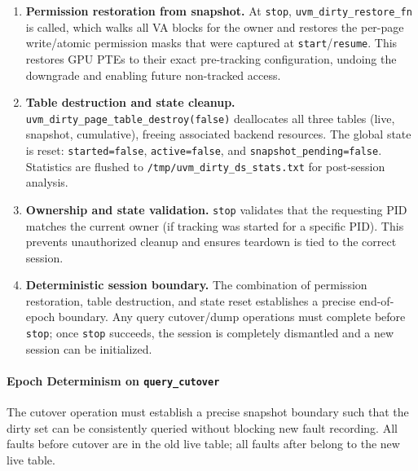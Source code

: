 \begin{enumerate}
    \item \textbf{Permission restoration from snapshot.}
          At \texttt{stop}, \texttt{uvm\_dirty\_restore\_fn} is called, which
          walks all VA blocks for the owner and restores the per-page write/atomic
          permission masks that were captured at \texttt{start}/\texttt{resume}.
          This restores GPU PTEs to their exact pre-tracking configuration,
          undoing the downgrade and enabling future non-tracked access.

    \item \textbf{Table destruction and state cleanup.}
          \texttt{uvm\_dirty\_page\_table\_destroy(false)} deallocates all three
          tables (live, snapshot, cumulative), freeing associated backend resources.
          The global state is reset: \texttt{started=false}, \texttt{active=false},
          and \texttt{snapshot\_pending=false}. Statistics are flushed to
          \texttt{/tmp/uvm\_dirty\_ds\_stats.txt} for post-session analysis.

    \item \textbf{Ownership and state validation.}
          \texttt{stop} validates that the requesting PID matches the current
          owner (if tracking was started for a specific PID). This prevents
          unauthorized cleanup and ensures teardown is tied to the correct session.

    \item \textbf{Deterministic session boundary.}
          The combination of permission restoration, table destruction, and
          state reset establishes a precise end-of-epoch boundary. Any query
          cutover/dump operations must complete before \texttt{stop}; once
          \texttt{stop} succeeds, the session is completely dismantled and
          a new session can be initialized.
\end{enumerate}

\vspace{1em}

\paragraph{Epoch Determinism on \texttt{query\_cutover}}
The cutover operation must establish a precise snapshot boundary such that the
dirty set can be consistently queried without blocking new fault recording.
All faults before cutover are in the old live table; all faults after belong
to the new live table.

